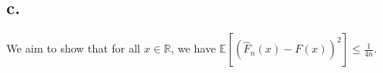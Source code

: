 \documentclass{article}
\newcommand{\field}[1]{\mathbb{#1}}
\newcommand{\1}{\mathbf{1}}
\newcommand{\E}{\mathbb{E}}
\newcommand{\R}{\field{R}} %
\begin{document}
{%

\subsection*{c.}
We aim to show that for all $x \in \R$, we have  $\displaystyle \E[ ( \widehat{F}_n(x) - F(x) )^2 ] \leq \tfrac{1}{4n}$. \\ 



}
\end{document}
